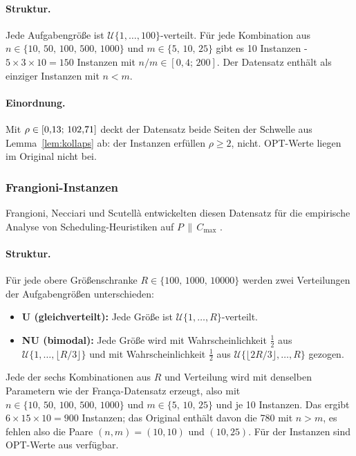 \paragraph{Struktur.}
Jede Aufgabengröße ist $\mathcal{U}\{1,\ldots,100\}$-verteilt.
Für jede Kombination aus $n \in \{10,\,50,\,100,\,500,\,1000\}$ und $m \in \{5,\,10,\,25\}$ gibt es
10 Instanzen - $5 \times 3 \times 10 = 150$ Instanzen mit $n/m \in [0{,}4;\, 200]$.
Der Datensatz enthält als einziger Instanzen mit $n < m$.

\paragraph{Einordnung.}
Mit $\rho \in [0{,}13;\, 102{,}71]$ deckt der Datensatz beide Seiten der
Schwelle aus Lemma~\ref{lem:kollaps} ab: \EvalRhoZweiFranca{} der \EvalInstanzenFranca{}
Instanzen erfüllen $\rho \ge 2$, \EvalRhoUnterZweiFranca{} nicht.
OPT-Werte liegen im Original nicht bei.

\subsubsection{Frangioni-Instanzen}
\label{sub:bench-frangioni}

Frangioni, Necciari und Scutellà entwickelten diesen Datensatz für die empirische Analyse
von Scheduling-Heuristiken auf $P\,\|\,C_{\max}$ \cite{frangioni2004}.

\paragraph{Struktur.}
Für jede obere Größenschranke $R \in \{100,\,1000,\,10000\}$ werden zwei Verteilungen der
Aufgabengrößen unterschieden:
\begin{itemize}[nosep]
  \item \textbf{U (gleichverteilt):} Jede Größe ist $\mathcal{U}\{1,\ldots,R\}$-verteilt.
  \item \textbf{NU (bimodal):} Jede Größe wird mit Wahrscheinlichkeit $\tfrac{1}{2}$ aus
    $\mathcal{U}\{1,\ldots,\lfloor R/3 \rfloor\}$ und mit Wahrscheinlichkeit $\tfrac{1}{2}$
    aus $\mathcal{U}\{\lfloor 2R/3 \rfloor,\ldots,R\}$ gezogen.
\end{itemize}
Jede der sechs Kombinationen aus $R$ und Verteilung wird mit denselben Parametern wie der
França-Datensatz erzeugt, also mit $n \in \{10,\,50,\,100,\,500,\,1000\}$ und
$m \in \{5,\,10,\,25\}$ und je 10 Instanzen.
Das ergibt $6 \times 15 \times 10 = 900$ Instanzen; das Original enthält davon die 780 mit
$n > m$, es fehlen also die Paare $(n,m) = (10,10)$ und $(10,25)$.
Für \EvalOptBekanntFrangioni{} der \EvalInstanzenFrangioni{} Instanzen sind OPT-Werte aus
\textcite{akram2025} verfügbar.


